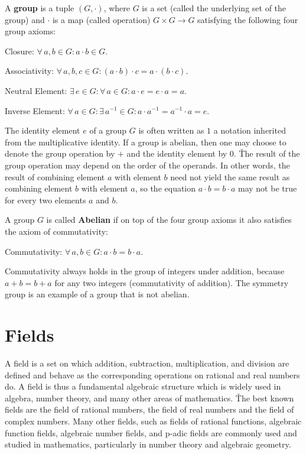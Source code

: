 \bd [Group]
A \textbf{group} is a tuple $(G,\cdot)$, where $G$ is a set (called the underlying set of the group) and $\cdot$ is a
map (called operation) $G\times G \to G$ satisfying the following four group axioms:
\bit
\item Closure: $\forall \, a,b \in G : a \cdot b \in G$.
\item Associativity: $\forall \, a,b,c \in G : (a \cdot b) \cdot c=a \cdot (b \cdot c)$.
\item Neutral Element: $\exists \, e \in G : \forall \, a \in G : a \cdot e = e \cdot a=a$.
\item Inverse Element: $\forall \, a \in G : \exists \, a^{-1} \in G : a \cdot a^{-1} =a^{-1} \cdot a = e$.
\eit
\ed

The identity element $e$ of a group $G$ is often written as $1$ a notation inherited from the multiplicative identity.
If a group is abelian, then one may choose to denote the group operation by $+$ and the identity element by $0$. \v

The result of the group operation may depend on the order of the operands. In other words, the result of combining
element $a$ with element $b$ need not yield the same result as combining element $b$ with element $a$, so the
equation $a \cdot b = b \cdot a$ may not be true for every two elements $a$ and $b$.

A group $G$ is called \textbf{Abelian} if on top of the four group axioms it also satisfies the axiom of commutativity:
\bit
\item Commutativity: $\forall \, a,b \in G : a \cdot b = b \cdot a$.
\eit
\ed

Commutativity always holds in the group of integers under addition, because $a + b = b + a$ for any two integers
(commutativity of addition). The symmetry group is an example of a group that is not abelian.

\section{Fields}

A field is a set on which addition, subtraction, multiplication, and division are defined and behave as the
corresponding operations on rational and real numbers do. A field is thus a fundamental algebraic structure which is
widely used in algebra, number theory, and many other areas of mathematics. \v

The best known fields are the field of rational numbers, the field of real numbers and the field of complex numbers.
Many other fields, such as fields of rational functions, algebraic function fields, algebraic number fields, and
p-adic fields are commonly used and studied in mathematics, particularly in number theory and algebraic geometry.

